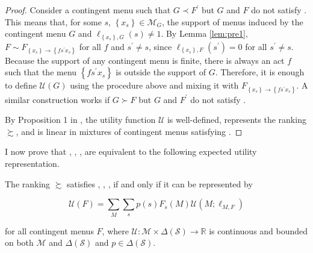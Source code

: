 \begin{proof}
	Consider a contingent menu such that \( G \prec F^{\prime} \) but \( G \) and \( F \) do not satisfy . This means that, for some \( s \), \( \left\{ x_{s} \right\} \in \mathcal{M}_G \), the support of menus induced by the contingent menu \( G \) and \( \ell_{\left\{ x_s \right\}, G} \left( s \right) \neq 1 \). By Lemma \ref{lem:pre1}, \( F \sim F_{ \left\{ x_{s} \right\} \rightarrow \left\{ f s^{\prime} x_{s} \right\}} \) for all \( f \) and \( s^{\prime} \neq s \), since \( \ell_{\left\{ x_{s} \right\}, F} \left( s^{\prime} \right) = 0 \) for all \( s^{\prime} \neq s \). Because the support of any contingent menu is finite, there is always an act \( f \) such that the menu \(  \left\{ f s^{\prime} x_{s} \right\} \) is outside the support of \( G \). Therefore, it is enough to define \( \mathscr{U} \left( G \right) \) using the procedure above and mixing it with \( F_{ \left\{ x_{s} \right\} \rightarrow \left\{ f s^{\prime} x_{s} \right\}} \). A similar construction works if \( G \succ F \) but \( G \) and \( F^{\prime} \) do not satisfy .

	By Proposition 1 in \cite{liangInformationdependentExpectedUtility2017}, the utility function \( \mathscr{U} \) is well-defined, represents the ranking \( \succsim \), and is linear in mixtures of contingent menus satisfying .
\end{proof}

I now prove that , , ,  are equivalent to the following expected utility representation.

\begin{prop}\label{prop:liang}
	The ranking \(\succsim\) satisfies , , ,  if and only if it can be represented by

	\begin{equation}\label{eq:contmenu}
		\mathscr{U}(F)=\sum_{M} \sum_{s} p \left( s \right) F_{s} \left( M \right) \mathcal{U} \left(M ; \ell_{M, F} \right)
	\end{equation}

	for all contingent menus \( F \), where \(\mathcal{U} : \mathcal{M} \times \Delta \left( \mathcal{S} \right) \rightarrow \mathbb{R} \) is continuous and bounded on both \(\mathcal{M}\) and \( \Delta \left( \mathcal{S} \right) \) and \( p \in \Delta \left( \mathcal{S} \right) \).
\end{prop}

